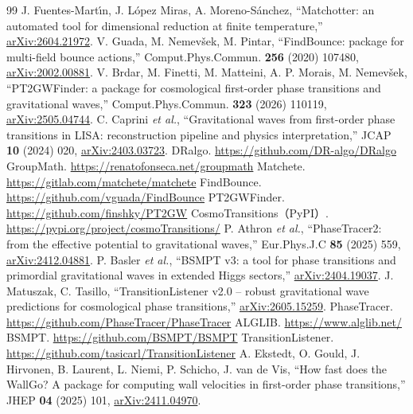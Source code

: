 \documentclass[a4paper,10pt]{ltjsarticle}
\begin{document}
\begin{thebibliography}{99}
 J. Fuentes-Mart\'{\i}n, J. L\'opez Miras, A. Moreno-S\'anchez, ``Matchotter: an automated tool for dimensional reduction at finite temperature,'' \href{https://arxiv.org/abs/2604.21972}{arXiv:2604.21972}.
 V. Guada, M. Nemev\v{s}ek, M. Pintar, ``FindBounce: package for multi-field bounce actions,'' Comput.Phys.Commun. \textbf{256} (2020) 107480, \href{https://arxiv.org/abs/2002.00881}{arXiv:2002.00881}.
 V. Brdar, M. Finetti, M. Matteini, A. P. Morais, M. Nemev\v{s}ek, ``PT2GWFinder: a package for cosmological first-order phase transitions and gravitational waves,'' Comput.Phys.Commun. \textbf{323} (2026) 110119, \href{https://arxiv.org/abs/2505.04744}{arXiv:2505.04744}.
 C. Caprini \textit{et al.}, ``Gravitational waves from first-order phase transitions in LISA: reconstruction pipeline and physics interpretation,'' JCAP \textbf{10} (2024) 020, \href{https://arxiv.org/abs/2403.03723}{arXiv:2403.03723}.
 DRalgo. \url{https://github.com/DR-algo/DRalgo}
 GroupMath. \url{https://renatofonseca.net/groupmath}
 Matchete. \url{https://gitlab.com/matchete/matchete}
 FindBounce. \url{https://github.com/vguada/FindBounce}
 PT2GWFinder. \url{https://github.com/finshky/PT2GW}
 CosmoTransitions（PyPI）. \url{https://pypi.org/project/cosmoTransitions/}
 P. Athron \textit{et al.}, ``PhaseTracer2: from the effective potential to gravitational waves,'' Eur.Phys.J.C \textbf{85} (2025) 559, \href{https://arxiv.org/abs/2412.04881}{arXiv:2412.04881}.
 P. Basler \textit{et al.}, ``BSMPT v3: a tool for phase transitions and primordial gravitational waves in extended Higgs sectors,'' \href{https://arxiv.org/abs/2404.19037}{arXiv:2404.19037}.
 J. Matuszak, C. Tasillo, ``TransitionListener v2.0 -- robust gravitational wave predictions for cosmological phase transitions,'' \href{https://arxiv.org/abs/2605.15259}{arXiv:2605.15259}.
 PhaseTracer. \url{https://github.com/PhaseTracer/PhaseTracer}
 ALGLIB. \url{https://www.alglib.net/}
 BSMPT. \url{https://github.com/BSMPT/BSMPT}
 TransitionListener. \url{https://github.com/tasicarl/TransitionListener}
 A. Ekstedt, O. Gould, J. Hirvonen, B. Laurent, L. Niemi, P. Schicho, J. van de Vis, ``How fast does the WallGo? A package for computing wall velocities in first-order phase transitions,'' JHEP \textbf{04} (2025) 101, \href{https://arxiv.org/abs/2411.04970}{arXiv:2411.04970}.

\end{thebibliography}
\end{document}

